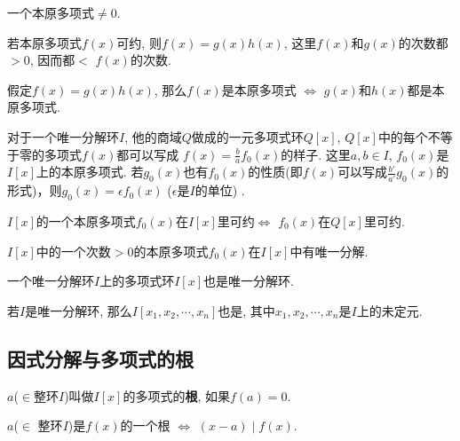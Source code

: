 \begin{Proposition}
一个本原多项式$\neq \mathfrak{0}$.
\end{Proposition}

\begin{Proposition}
若本原多项式$f(x)$可约, 则$f(x) = g(x) h(x)$, 这里$f(x)$和$g(x)$的次数都$> 0$, 因而都$<$
$f(x)$的次数.
\end{Proposition}

\begin{Lemma}
假定$f(x) = g(x) h(x)$, 那么$f(x)$是本原多项式 $\Leftrightarrow$ $g(x)$和$h(x)$都是本原多项式.
\end{Lemma}

\begin{Lemma}
对于一个唯一分解环$I$, 他的商域$Q$做成的一元多项式环$Q[x]$, 
$Q[x]$中的每个不等于零的多项式$f(x)$都可以写成
$\displaystyle f(x) = \frac{b}{a} f_0(x)$的样子.
这里$a, b \in I$, $f_0(x)$是$I[x]$上的本原多项式.
若$g_0(x)$也有$f_0(x)$的性质(即$f(x)$可以写成$\displaystyle \frac{b'}{a'} g_0(x)$的形式)，则$g_0(x) = \epsilon f_0(x)$ ($\epsilon$是$I$的单位)
.\end{Lemma}

\begin{Lemma}
$I[x]$的一个本原多项式$f_0(x)$在$I[x]$里可约$\Leftrightarrow$ $f_0(x)$在$Q[x]$里可约.
\end{Lemma}

\begin{Lemma}
$I[x]$中的一个次数$>0$的本原多项式$f_0(x)$在$I[x]$中有唯一分解.
\end{Lemma}

\begin{Theorem}
一个唯一分解环$I$上的多项式环$I[x]$也是唯一分解环.
\end{Theorem}

\begin{Theorem}
若$I$是唯一分解环, 那么$I[x_1, x_2, \cdots, x_n]$也是, 其中$x_1, x_2, \cdots, x_n$是$I$上的未定元.
\end{Theorem}

\subsection{因式分解与多项式的根}

\begin{Definition}
$a $\;($\in $整环$I$)叫做$I[x]$的多项式的\textbf{根}, 如果$f(a) = \mathfrak{0}$.
\end{Definition}

\begin{Theorem}
$a $\;($\in$ 整环$I$)是$f(x)$的一个根 $\Leftrightarrow$ $(x - a) \mid f(x)$.
\end{Theorem}

